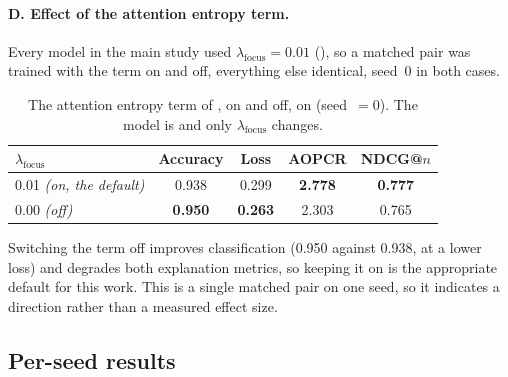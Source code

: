 \paragraph{D. Effect of the attention entropy term.}
Every model in the main study used $\lambda_{\text{focus}} = 0.01$ (), so a matched
pair was trained with the term on and off, everything else identical, seed~0 in both cases.

\begin{table}[htbp]
\caption{The attention entropy term of , on and off, on \webtraffic{} (seed~$=0$).
The model is \mbot{} and only $\lambda_{\text{focus}}$ changes.}
\label{tab:ablation_focus}
\begin{center}
\small
\begin{tabular}{lcccc}
\toprule
\textbf{$\lambda_{\text{focus}}$} & \textbf{Accuracy} & \textbf{Loss} & \textbf{AOPCR} & \textbf{NDCG@$n$} \\
\midrule
0.01 \emph{(on, the default)} & 0.938 & 0.299 & \textbf{2.778} & \textbf{0.777} \\
0.00 \emph{(off)}             & \textbf{0.950} & \textbf{0.263} & 2.303 & 0.765 \\
\bottomrule
\end{tabular}
\end{center}
\end{table}

Switching the term off improves classification (0.950 against 0.938, at a lower loss) and degrades
both explanation metrics, so keeping it on is the appropriate default for this work. This is a
single matched pair on one seed, so it indicates a direction rather than a measured effect size.

\subsection{Per-seed results}
\label{app:seeds}

